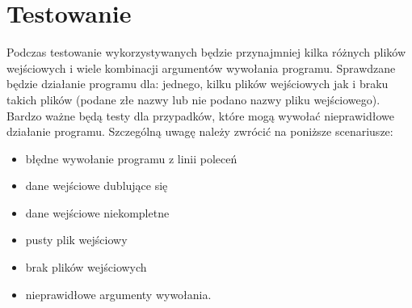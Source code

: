 \documentclass[a4paper,11pt,notitlepage]{article}
\begin{document}
\section{Testowanie}

Podczas testowanie wykorzystywanych będzie przynajmniej kilka różnych plików wejściowych i wiele kombinacji argumentów wywołania programu. Sprawdzane będzie działanie programu dla: jednego, kilku plików wejściowych jak i braku takich plików (podane złe nazwy lub nie podano nazwy pliku wejściowego). Bardzo ważne będą testy dla przypadków, które mogą wywołać nieprawidłowe działanie programu. Szczególną uwagę należy zwrócić na poniższe scenariusze:
\begin{itemize}
		\item błędne wywołanie programu z linii poleceń
 		\item dane wejściowe dublujące się
 		\item dane wejściowe niekompletne
 		\item pusty plik wejściowy
 		\item brak plików wejściowych
 		\item nieprawidłowe argumenty wywołania.
\end{itemize}
 
\end{document}
